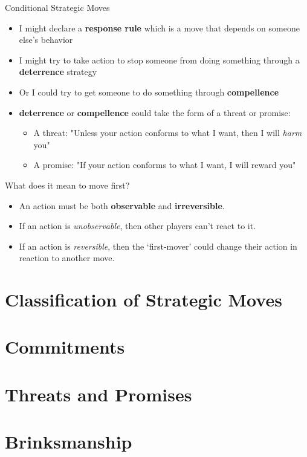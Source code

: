 \documentclass{beamer}
\theoremstyle{plain}
\begin{document}
\begin{frame}{}
  Conditional Strategic Moves 
  \begin{itemize}
    \item I might declare a \textbf{response rule} 
    which is a move that depends on someone else's behavior
    \item I might try to take action to stop someone from doing something 
    through a \textbf{deterrence} strategy
    \item Or I could try to get someone to do something 
    through \textbf{compellence}
    \item \textbf{deterrence} or \textbf{compellence} could take the form 
    of a \alert{threat} or \alert{promise}:
    \begin{itemize}
      \item A \alert{threat}: 
      "Unless your action conforms to what I want, then I will \textit{harm} you"
      \item A \alert{promise}:
      "If your action conforms to what I want, I will \alert{reward} you"
    \end{itemize}
  \end{itemize}
\end{frame}


\begin{frame}{What does it mean to move first?}
  \begin{itemize}
    \item An action must be both \textbf{observable} and \textbf{irreversible}.
    \item If an action is \textit{unobservable}, 
    then other players can't react to it.
    \item If an action is \textit{reversible},
    then the `first-mover' could change their action in reaction to another move.
  \end{itemize} 
\end{frame}

\section{Classification of Strategic Moves}


\section{Commitments}


\section{Threats and Promises}


\section{Brinksmanship}

\end{document}
